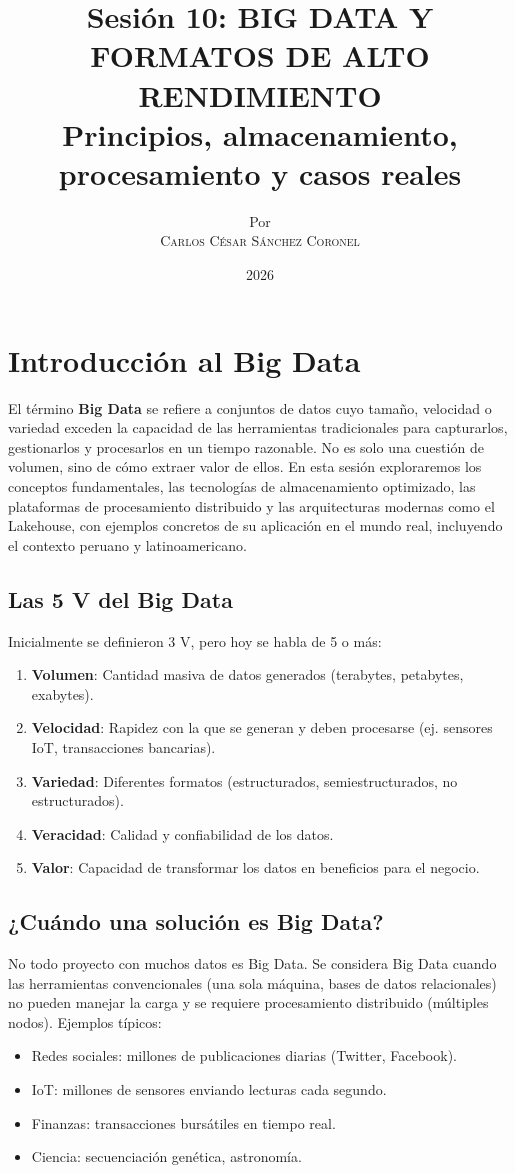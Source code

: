 \documentclass[12pt,a4paper,openany,oneside]{book}
\title{
    \Huge \textbf{Sesión 10: BIG DATA Y FORMATOS DE ALTO RENDIMIENTO} \\
    \large Principios, almacenamiento, procesamiento y casos reales
}
\author{
    \small Por \\ \vspace{0.2cm}
    \Large \textsc{Carlos César Sánchez Coronel}
}
\date{2026}
\begin{document}
\maketitle

\tableofcontents
{}

\chapter{Introducción al Big Data}
El término \textbf{Big Data} se refiere a conjuntos de datos cuyo tamaño, velocidad o variedad exceden la capacidad de las herramientas tradicionales para capturarlos, gestionarlos y procesarlos en un tiempo razonable. No es solo una cuestión de volumen, sino de cómo extraer valor de ellos. En esta sesión exploraremos los conceptos fundamentales, las tecnologías de almacenamiento optimizado, las plataformas de procesamiento distribuido y las arquitecturas modernas como el Lakehouse, con ejemplos concretos de su aplicación en el mundo real, incluyendo el contexto peruano y latinoamericano.

\section{Las 5 V del Big Data}
Inicialmente se definieron 3 V, pero hoy se habla de 5 o más:
\begin{enumerate}
    \item \textbf{Volumen}: Cantidad masiva de datos generados (terabytes, petabytes, exabytes).
    \item \textbf{Velocidad}: Rapidez con la que se generan y deben procesarse (ej. sensores IoT, transacciones bancarias).
    \item \textbf{Variedad}: Diferentes formatos (estructurados, semiestructurados, no estructurados).
    \item \textbf{Veracidad}: Calidad y confiabilidad de los datos.
    \item \textbf{Valor}: Capacidad de transformar los datos en beneficios para el negocio.
\end{enumerate}

\section{¿Cuándo una solución es Big Data?}
No todo proyecto con muchos datos es Big Data. Se considera Big Data cuando las herramientas convencionales (una sola máquina, bases de datos relacionales) no pueden manejar la carga y se requiere procesamiento distribuido (múltiples nodos). Ejemplos típicos:
\begin{itemize}
    \item Redes sociales: millones de publicaciones diarias (Twitter, Facebook).
    \item IoT: millones de sensores enviando lecturas cada segundo.
    \item Finanzas: transacciones bursátiles en tiempo real.
    \item Ciencia: secuenciación genética, astronomía.
\end{itemize}
\end{document}
